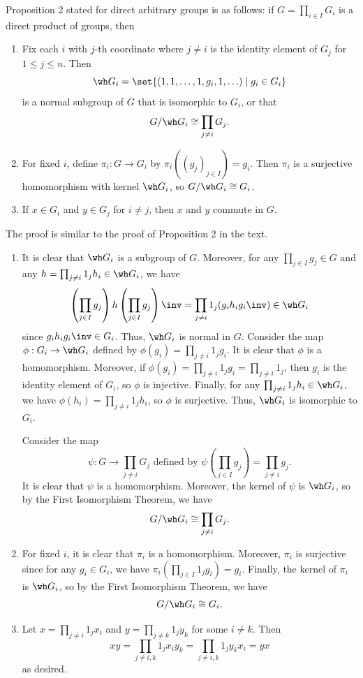 \begin{sol}
    Proposition 2 stated for direct arbitrary groups is as follows: if $G = \prod_{i \in I} G_i$ is a direct product of groups, then
    \begin{enumerate}
        \item Fix each $i$ with $j$-th coordinate where $j \neq i$ is the identity element of $G_j$ for $1 \leq j \leq n$. Then
        \[\wh G_i = \set{(1, 1, \ldots, 1, g_i, 1, \ldots) \mid g_i \in G_i}\] is a normal subgroup of $G$ that is isomorphic to $G_i$, or that
        \[G/\wh G_i \cong \prod_{j \neq i} G_j.\]
        \item For fixed $i$, define $\pi_i : G \to G_i$ by $\pi_i((g_j)_{j \in I}) = g_i$. Then $\pi_i$ is a surjective homomorphism with kernel $\wh G_i$, so $G/\wh G_i \cong G_i$.
        \item If $x \in G_i$ and $y \in G_j$ for $i \neq j$, then $x$ and $y$ commute in $G$.
    \end{enumerate}
    The proof is similar to the proof of Proposition 2 in the text.
    \begin{enumerate}
        \item It is clear that $\wh G_i$ is a subgroup of $G$. Moreover, for any $\prod_{j \in I} g_j \in G$ and any $h = \prod_{j \neq i} 1_j h_i \in \wh G_i$, we have
        \[\left(\prod_{j \in I} g_j\right)h\left(\prod_{j \in I} g_j\right)\inv = \prod_{j \neq i} 1_j (g_i h_i g_i\inv) \in \wh G_i\]
        since $g_i h_i g_i\inv \in G_i$. Thus, $\wh G_i$ is normal in $G$. Consider the map $\phi : G_i \to \wh G_i$ defined by $\phi(g_i) = \prod_{j \neq i} 1_j g_i$. It is clear that $\phi$ is a homomorphism. Moreover, if $\phi(g_i) = \prod_{j \neq i} 1_j g_i = \prod_{j \neq i} 1_j$, then $g_i$ is the identity element of $G_i$, so $\phi$ is injective. Finally, for any $\prod_{j \neq i} 1_j h_i \in \wh G_i$, we have $\phi(h_i) = \prod_{j \neq i} 1_j h_i$, so $\phi$ is surjective. Thus, $\wh G_i$ is isomorphic to $G_i$. 
        
        Consider the map
        \[\psi : G \to \prod_{j \neq i} G_j \text{ defined by } \psi\left(\prod_{j \in I} g_j\right) = \prod_{j \neq i} g_j.\]
        It is clear that $\psi$ is a homomorphism. Moreover, the kernel of $\psi$ is $\wh G_i$, so by the First Isomorphism Theorem, we have
        \[G/\wh G_i \cong \prod_{j \neq i} G_j.\]
        \item For fixed $i$, it is clear that $\pi_i$ is a homomorphism. Moreover, $\pi_i$ is surjective since for any $g_i \in G_i$, we have $\pi_i(\prod_{j \in I} 1_j g_i) = g_i$. Finally, the kernel of $\pi_i$ is $\wh G_i$, so by the First Isomorphism Theorem, we have
        \[G/\wh G_i \cong G_i.\]
        \item Let $x = \prod_{j \neq i} 1_j x_i$ and $y = \prod_{j \neq k} 1_j y_k$ for some $i \neq k$. Then
        \[xy = \prod_{j \neq i, k} 1_j x_i y_k = \prod_{j \neq i, k} 1_j y_k x_i = yx\]
        as desired.
    \end{enumerate}
\end{sol}

